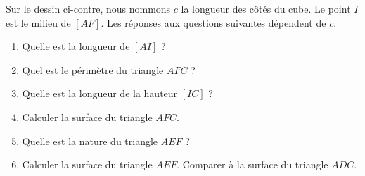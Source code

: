 
\begin{exercice}\label{exosmath-0115}

    Sur le dessin ci-contre, nous nommons \( c\) la longueur des côtés du cube. Le point \( I\) est le milieu de \( [AF]\). Les réponses aux questions suivantes dépendent de \( c\).
    \begin{multicols}{2}

        \begin{enumerate}
            \item
                Quelle est la longueur de \( [AI]\) ?
            \item
                Quel est le périmètre du triangle \( AFC\) ?
            \item
                Quelle est la longueur de la hauteur \( [IC]\) ?
            \item
                Calculer la surface du triangle \( AFC\).
            \item
                Quelle est la nature du triangle \( AEF\) ?
            \item
                Calculer la surface du triangle \( AEF\). Comparer à la surface du triangle \( ADC\).
        \end{enumerate}

        \columnbreak



        \begin{center}

        \end{center}

    \end{multicols}
    

\end{exercice}
